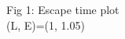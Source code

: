 \documentclass[preview]{standalone}
\begin{document}
\begin{center}
Fig 1: Escape time plot\\ (L, E)=(1, 1.05)
\end{center}
\end{document}
